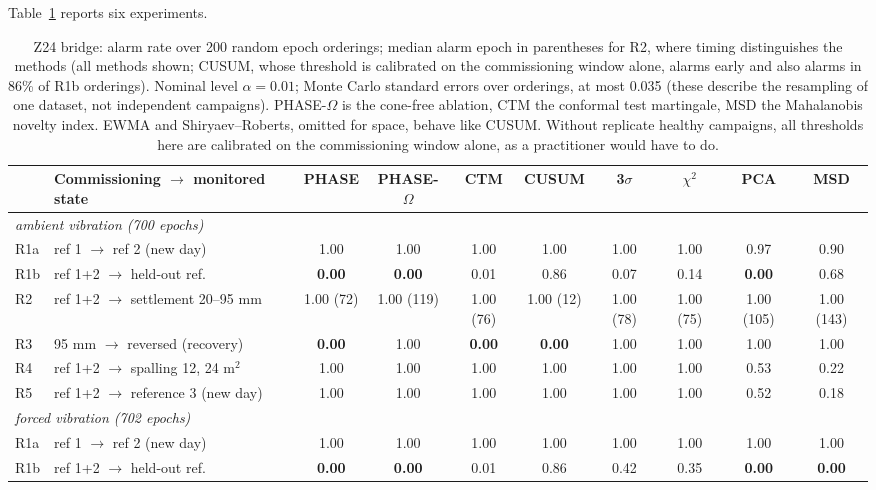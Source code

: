 \documentclass[12pt,a4paper]{article}
\newcommand{\rev}[1]{#1}
\newcommand{\rev}[1]{{\color{revcol}#1}}
\begin{document}
Table~\ref{tab:z24} reports six experiments.

\begin{table}[t]
\centering
\scriptsize
\setlength{\tabcolsep}{2.6pt}
\caption{Z24 bridge: alarm rate over 200 random epoch orderings; median alarm epoch in parentheses for R2, where timing distinguishes the methods \rev{(all methods shown; CUSUM, whose threshold is calibrated on the commissioning window alone, alarms early and also alarms in 86\% of R1b orderings)}. Nominal level $\alpha=0.01$; \rev{Monte Carlo standard errors over orderings, at most 0.035 (these describe the resampling of one dataset, not independent campaigns)}. PHASE-$\Omega$ is the cone-free ablation, CTM the conformal test martingale, MSD the Mahalanobis novelty index. EWMA and Shiryaev--Roberts, omitted for space, behave like CUSUM. Without replicate healthy campaigns, all thresholds here are calibrated on the commissioning window alone, as a practitioner would have to do.}
\label{tab:z24}
\begin{tabular}{llcccccccc}
\toprule
& Commissioning $\to$ monitored state & PHASE & PHASE-$\Omega$ & CTM & CUSUM & 3$\sigma$ & $\chi^2$ & PCA & MSD \\
\midrule
\multicolumn{10}{l}{\textit{ambient vibration (700 epochs)}}\\
R1a & ref 1 $\to$ ref 2 (new day) & 1.00 & 1.00 & 1.00 & 1.00 & 1.00 & 1.00 & 0.97 & 0.90 \\
R1b & ref 1+2 $\to$ held-out ref. & \textbf{0.00} & \textbf{0.00} & 0.01 & 0.86 & 0.07 & 0.14 & \textbf{0.00} & 0.68 \\
R2  & ref 1+2 $\to$ settlement 20--95 mm & 1.00 (72) & 1.00 (119) & 1.00 (76) & 1.00 (12) & 1.00 (78) & 1.00 (75) & 1.00 (105) & 1.00 (143) \\
R3  & 95 mm $\to$ reversed (recovery) & \textbf{0.00} & 1.00 & \textbf{0.00} & \textbf{0.00} & 1.00 & 1.00 & 1.00 & 1.00 \\
R4  & ref 1+2 $\to$ spalling 12, 24 m$^2$ & 1.00 & 1.00 & 1.00 & 1.00 & 1.00 & 1.00 & 0.53 & 0.22 \\
R5  & ref 1+2 $\to$ reference 3 (new day) & 1.00 & 1.00 & 1.00 & 1.00 & 1.00 & 1.00 & 0.52 & 0.18 \\
\midrule
\multicolumn{10}{l}{\textit{forced vibration (702 epochs)}}\\
R1a & ref 1 $\to$ ref 2 (new day) & 1.00 & 1.00 & 1.00 & 1.00 & 1.00 & 1.00 & 1.00 & 1.00 \\
R1b & ref 1+2 $\to$ held-out ref. & \textbf{0.00} & \textbf{0.00} & 0.01 & 0.86 & 0.42 & 0.35 & \textbf{0.00} & \textbf{0.00} \\

\end{tabular}
\end{table}
\end{document}
